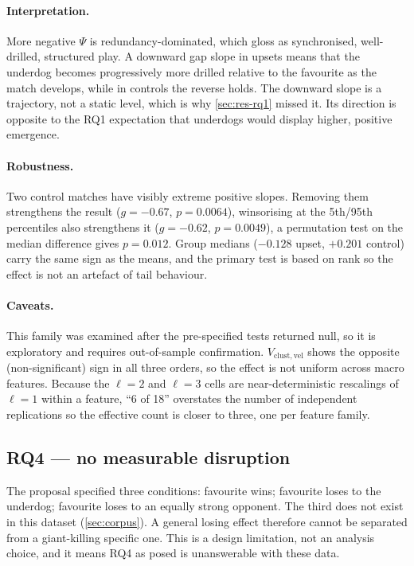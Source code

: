 \documentclass[11pt,a4paper]{article}
\newcommand{\Vcv}{V_{\mathrm{clust,vel}}}
\begin{document}
\paragraph{Interpretation.} More negative $\Psi$ is redundancy-dominated, which
\cite{rosas2020,cheng2025} gloss as synchronised, well-drilled, structured play. A downward
gap slope in upsets means that the underdog becomes progressively more drilled
relative to the favourite as the match develops, while in controls the reverse holds. The downward slope is a trajectory, not a static level, which is why
\cref{sec:res-rq1} missed it. Its direction is opposite to the RQ1 expectation that
underdogs would display higher, positive emergence.

\paragraph{Robustness.} Two control matches have visibly extreme positive slopes. Removing
them strengthens the result ($g=-0.67$, $p=0.0064$), winsorising at the 5th/95th
percentiles also strengthens it ($g=-0.62$, $p=0.0049$), a permutation test on the median
difference gives $p=0.012$. Group medians ($-0.128$ upset, $+0.201$ control) carry the same
sign as the means, and the primary test is based on rank so the effect is not an artefact of
tail behaviour.

\paragraph{Caveats.} This family was examined after the pre-specified tests returned null,
so it is exploratory and requires out-of-sample confirmation. $\Vcv$ shows the opposite
(non-significant) sign in all three orders, so the effect is not uniform across macro
features. Because the $\ell=2$ and $\ell=3$ cells are near-deterministic rescalings of
$\ell=1$ within a feature, ``6 of 18'' overstates the number of independent replications so the effective count is closer to three, one per feature family.

\subsection{RQ4 --- no measurable disruption}
\label{sec:res-rq4}

The proposal specified three conditions: favourite wins; favourite loses to the underdog;
favourite loses to an equally strong opponent. The third does not exist in this
dataset (\cref{sec:corpus}). A general losing effect therefore cannot be separated from a
giant-killing specific one. This is a design limitation, not an analysis choice, and it
means RQ4 as posed is unanswerable with these data.
\end{document}
